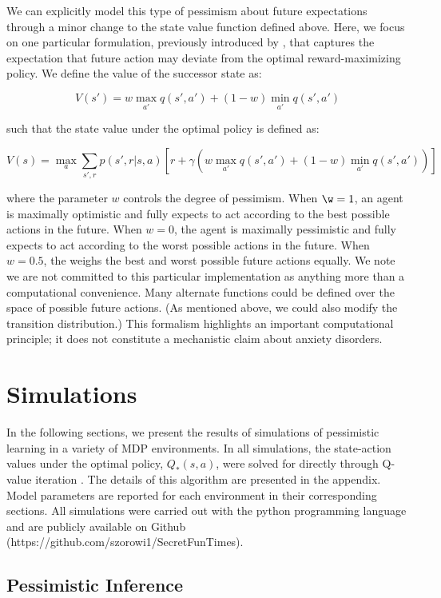\documentclass[11pt]{article} %
\begin{document}
We can explicitly model this type of pessimism about future expectations through a minor change to the state value function defined above. Here, we focus on one particular formulation, previously introduced by \cite{Gaskett2003}, that captures the expectation that future action may deviate from the optimal reward-maximizing policy. We define the value of the successor state as:

$$ V(s') = w \max_{a'} q(s',a') + (1 - w) \min_{a'} q(s',a') $$

such that the state value under the optimal policy is defined as:

$$ V(s) = \max_a \sum_{s',r}p(s',r|s,a) \left[ r + \gamma \left( w \max_{a'} q(s',a') + (1 - w) \min_{a'} q(s',a') \right) \right] $$

where the parameter $w$ controls the degree of pessimism. When $\w = 1$, an agent is maximally optimistic and fully expects to act according to the best possible actions in the future. When $w = 0$, the agent is maximally pessimistic and fully expects to act according to the worst possible actions in the future. When $w = 0.5$, the weighs the best and worst possible future actions equally. We note we are not committed to this particular implementation as anything more than a computational convenience. Many alternate functions could be defined over the space of possible future actions. (As mentioned above, we could also modify the transition distribution.) This formalism highlights an important computational principle; it does not constitute a mechanistic claim about anxiety disorders.

\section{Simulations}

In the following sections, we present the results of simulations of pessimistic learning in a variety of MDP environments. In all simulations, the state-action values under the optimal policy, $Q_*(s,a)$, were solved for directly through Q-value iteration \citep{SuttonBarto1998, SuttonBarto1998, bertsekas2005}. The details of this algorithm are presented in the appendix. Model parameters are reported for each environment in their corresponding sections. All simulations were carried out with the python programming language and are publicly available on Github (https://github.com/szorowi1/SecretFunTimes).

\subsection{Pessimistic Inference}
\end{document}
